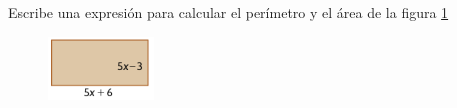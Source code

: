 \question[10] Escribe una expresión para calcular el perímetro y el área de la figura \ref{fig:20230319044608}

\begin{figure}[H]
    \centering
    \includegraphics[width=0.25\textwidth]{../images/20230319044608}
    \caption{}
    \label{fig:20230319044608}
\end{figure}
